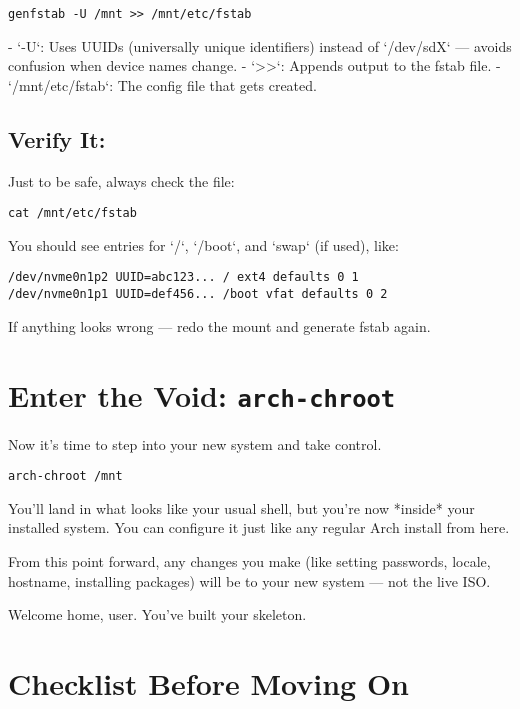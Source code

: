 \documentclass[12pt]{book}
\begin{document}
\begin{lstlisting}
genfstab -U /mnt >> /mnt/etc/fstab
\end{lstlisting}

- `-U`: Uses UUIDs (universally unique identifiers) instead of `/dev/sdX` — avoids confusion when device names change.
- `>>`: Appends output to the fstab file.
- `/mnt/etc/fstab`: The config file that gets created.

\subsection*{Verify It:}

Just to be safe, always check the file:

\begin{lstlisting}
cat /mnt/etc/fstab
\end{lstlisting}

You should see entries for `/`, `/boot`, and `swap` (if used), like:

\begin{lstlisting}
/dev/nvme0n1p2 UUID=abc123... / ext4 defaults 0 1
/dev/nvme0n1p1 UUID=def456... /boot vfat defaults 0 2
\end{lstlisting}

If anything looks wrong — redo the mount and generate fstab again.

\section{Enter the Void: \texttt{arch-chroot}}

Now it’s time to step into your new system and take control.

\begin{lstlisting}
arch-chroot /mnt
\end{lstlisting}

You’ll land in what looks like your usual shell, but you're now *inside* your installed system. You can configure it just like any regular Arch install from here.

From this point forward, any changes you make (like setting passwords, locale, hostname, installing packages) will be to your new system — not the live ISO.

Welcome home, user. You’ve built your skeleton.

\section*{Checklist Before Moving On}
\end{document}
